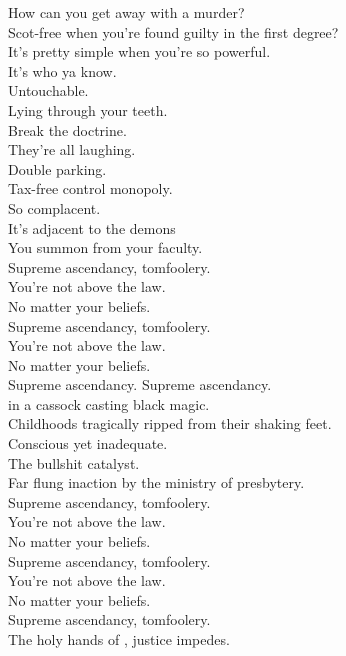 

How can you get away with a murder? \\
Scot-free when you're found guilty in the first degree? \\
It's pretty simple when you're so powerful. \\
It's who ya know. \\
Untouchable. \\
Lying through your teeth. \\
Break the doctrine. \\
They're all laughing. \\
Double parking. \\
Tax-free control monopoly. \\
So complacent. \\
It's adjacent to the demons \\
You summon from your faculty. \\

Supreme ascendancy, tomfoolery. \\
You're not above the law. \\
No matter your beliefs. \\
Supreme ascendancy, tomfoolery. \\
You're not above the law. \\
No matter your beliefs. \\

Supreme ascendancy. Supreme ascendancy. \\

 in a cassock casting black magic. \\
Childhoods tragically ripped from their shaking feet. \\
Conscious yet inadequate. \\
The bullshit catalyst. \\
Far flung inaction by the ministry of presbytery. \\

Supreme ascendancy, tomfoolery. \\
You're not above the law. \\
No matter your beliefs. \\
Supreme ascendancy, tomfoolery. \\
You're not above the law. \\
No matter your beliefs. \\
Supreme ascendancy, tomfoolery. \\
The holy hands of , justice impedes. \\

